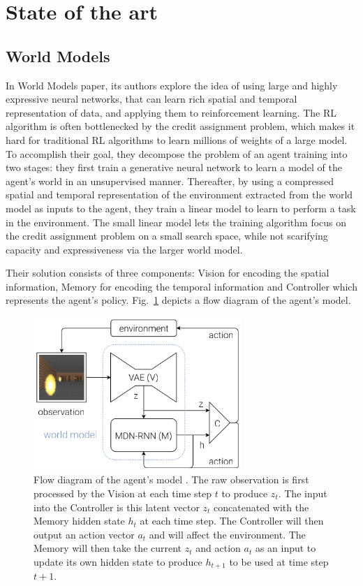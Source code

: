\section{State of the art}

\subsection{World Models}

In World Models \cite{Algo.WorldModels} paper, its authors explore the idea of using large and highly expressive neural networks, that can learn rich spatial and temporal representation of data, and applying them to reinforcement learning. The RL algorithm is often bottlenecked by the credit assignment problem, which makes it hard for traditional RL algorithms to learn millions of weights of a large model. To accomplish their goal, they decompose the problem of an agent training into two stages: they first train a generative neural network to learn a model of the agent's world in an unsupervised manner. Thereafter, by using a compressed spatial and temporal representation of the environment extracted from the world model as inputs to the agent, they train a linear model to learn to perform a task in the environment. The small linear model lets the training algorithm focus on the credit assignment problem on a small search space, while not scarifying capacity and expressiveness via the larger world model.

Their solution consists of three components: Vision for encoding the spatial information, Memory for encoding the temporal information and Controller which represents the agent's policy. Fig.~\ref{Fig.WorldModels} depicts a flow diagram of the agent's model.

\begin{figure}[H]
\includegraphics[width=0.7\textwidth,keepaspectratio]{figures/WorldModels.png}
\caption[Flow diagram of the World Models agent's model]{Flow diagram of the agent's model \protect\cite{Algo.WorldModels}. The raw observation is first processed by the Vision at each time step $t$ to produce $z_t$. The input into the Controller is this latent vector $z_t$ concatenated with the Memory hidden state $h_t$ at each time step. The Controller will then output an action vector $a_t$ and will affect the environment. The Memory will then take the current $z_t$ and action $a_t$ as an input to update its own hidden state to produce $h_{t+1}$ to be used at time step $t + 1$.}
\label{Fig.WorldModels}
\end{figure}

